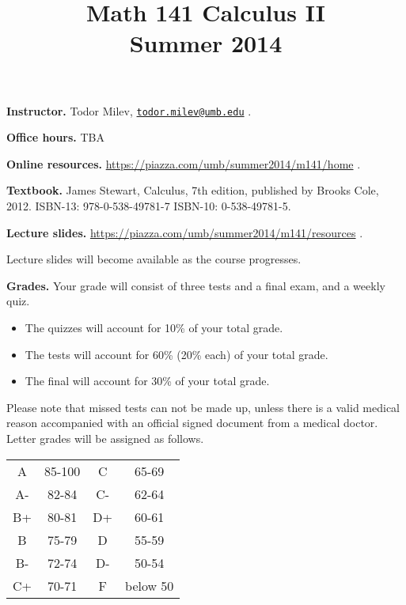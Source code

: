 \documentclass{article}
\title{Math 141 Calculus II \\ Summer 2014}
\begin{document}
\maketitle

\noindent \textbf{Instructor.} Todor Milev, \href{mailto:todor.milev@umb.edu}{\nolinkurl{todor.milev@umb.edu}} \quad \quad \quad .

\medskip
\noindent \textbf{Office hours. } TBA

\medskip
\noindent \textbf{Online resources. }  \url{https://piazza.com/umb/summer2014/m141/home}  \quad \quad \quad .


\medskip\noindent \textbf{Textbook. }  James Stewart, Calculus, 7th edition, published by Brooks Cole, 2012. ISBN-13: 978-0-538-49781-7
ISBN-10: 0-538-49781-5.

\medskip \noindent \textbf{Lecture slides. }  \url{https://piazza.com/umb/summer2014/m141/resources} \quad \quad \quad .

\medskip\noindent Lecture slides will become available as the course progresses.



\medskip
\noindent \textbf{Grades.} Your grade will consist of three tests and a final exam, and a weekly quiz. 
\begin{itemize}
\item The quizzes will account for 10\% of your total grade.
\item The tests will account for 60\% (20\% each) of your total grade.
\item The final will account for 30\% of your total grade.
\end{itemize}
Please note that missed tests can not be made up, unless there is a valid medical reason accompanied with an official signed document from a medical doctor. Letter grades will be assigned as follows. 

\begin{center}
\begin{tabular}{cc|cc}
A & 85-100 & C & 65-69 \\
A-& 82-84 & C- & 62-64 \\
B+& 80-81 & D+ & 60-61 \\
B & 75-79& D & 55-59\\
B-& 72-74& D- & 50-54\\
C+& 70-71& F & below 50\\
\end{tabular}

\end{center}
\end{document}
